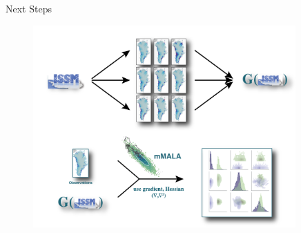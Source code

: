 \documentclass[hide notes,intlimits]{beamer}
\begin{document}
\begin{frame}{Next Steps}
    \begin{figure}
      \includegraphics[height=7.75cm]{surrogate_model_issm}
    \end{figure}
\end{frame}
\end{document}
